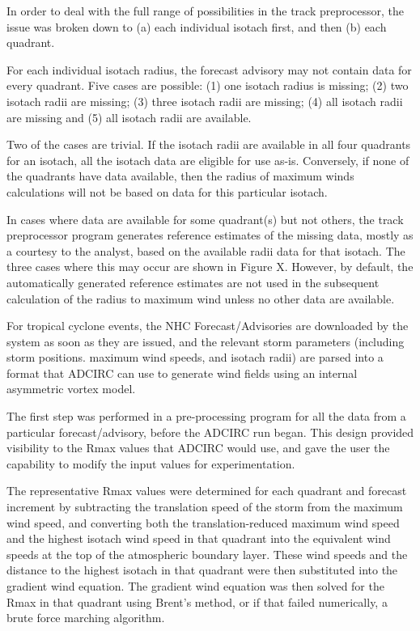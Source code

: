 \documentclass[jmse,article,submit,moreauthors,pdftex,12pt,a4paper]{mdpi}
\begin{document}
In order to deal with the full range of possibilities in the track 
preprocessor, the issue was broken down to (a) each individual 
isotach first, and then (b) each quadrant. 

For each individual isotach radius, the forecast advisory may not 
contain data for every quadrant. Five cases are possible: (1) one 
isotach radius is missing; (2) two isotach radii are missing; (3) 
three isotach radii are missing; (4) all isotach radii are missing 
and (5) all isotach radii are available. 

Two of the cases are trivial. If the isotach radii are available in 
all four quadrants for an isotach, all the isotach data are eligible 
for use as-is. Conversely, if none of the quadrants have data 
available, then the radius of maximum winds calculations will not be 
based on data for this particular isotach. 

In cases where data are available for some quadrant(s) but not 
others, the track preprocessor program generates reference estimates 
of the missing data, mostly as a courtesy to the analyst, based on 
the available radii data for that isotach. The three cases where 
this may occur are shown in Figure X. However, by default, the 
automatically generated reference estimates are not used in the 
subsequent calculation of the radius to maximum wind unless no other 
data are available. 

For tropical cyclone events, the NHC Forecast/Advisories are 
downloaded by the system as soon as they are issued, and the 
relevant storm parameters (including storm positions. maximum wind 
speeds, and isotach radii) are parsed into a format that ADCIRC can 
use to generate wind fields using an internal asymmetric vortex 
model. 

The first step was performed in a pre-processing program for all the 
data from a particular forecast/advisory, before the ADCIRC run 
began. This design provided visibility to the Rmax values that 
ADCIRC would use, and gave the user the capability to modify the 
input values for experimentation.

The representative Rmax values were determined for each quadrant and 
forecast increment by subtracting the translation speed of the storm 
from the maximum wind speed, and converting both the 
translation-reduced maximum wind speed and the highest isotach wind 
speed in that quadrant into the equivalent wind speeds at the top of 
the atmospheric boundary layer. These wind speeds and the distance 
to the highest isotach in that quadrant were then substituted into 
the gradient wind equation. The gradient wind equation was then 
solved for the Rmax in that quadrant using Brent's method, or if 
that failed numerically, a brute force marching algorithm.
\end{document}
